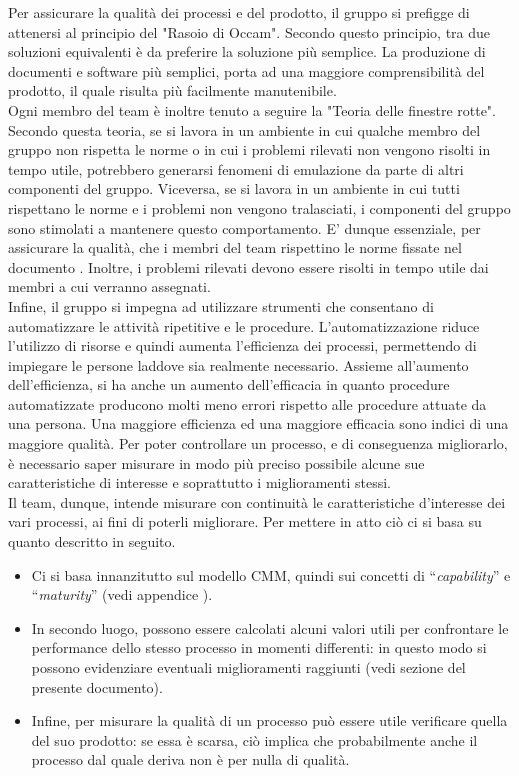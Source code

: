 
	Per assicurare la qualità dei processi e del prodotto, il gruppo \groupname{} si prefigge di attenersi al principio del "Rasoio di Occam". Secondo questo principio, tra due soluzioni equivalenti è da preferire la soluzione più semplice. La produzione di documenti e software più semplici, porta ad una maggiore comprensibilità del prodotto, il quale risulta più facilmente manutenibile.\\
Ogni membro del team è inoltre tenuto a seguire la "Teoria delle finestre rotte". Secondo questa teoria, se si lavora in un ambiente in cui qualche membro del gruppo non rispetta le norme o in cui i problemi rilevati non vengono risolti in tempo utile, potrebbero generarsi fenomeni di emulazione da parte di altri componenti del gruppo. Viceversa, se si lavora in un ambiente in cui tutti rispettano le norme e i problemi non vengono tralasciati, i componenti del gruppo sono stimolati a mantenere questo comportamento. E' dunque essenziale, per assicurare la qualità, che i membri del team rispettino le norme fissate nel documento . Inoltre, i problemi rilevati devono essere risolti in tempo utile dai membri a cui verranno assegnati.\\
Infine, il gruppo si impegna ad utilizzare strumenti che consentano di automatizzare le attività ripetitive e le procedure. L'automatizzazione riduce l'utilizzo di risorse e quindi aumenta l'efficienza dei processi, permettendo di impiegare le persone laddove sia realmente necessario. Assieme all'aumento dell'efficienza, si ha anche un aumento dell'efficacia in quanto procedure automatizzate producono molti meno errori rispetto alle procedure attuate da una persona. Una maggiore efficienza ed una maggiore efficacia sono indici di una maggiore qualità.
		Per poter controllare un processo, e di conseguenza migliorarlo, è necessario saper misurare in modo più preciso possibile alcune sue 
		caratteristiche di interesse e soprattutto i miglioramenti stessi.\\
		Il team, dunque, intende misurare con continuità le caratteristiche d'interesse dei vari processi, ai fini di poterli migliorare. Per mettere in atto ciò ci si basa su quanto descritto in seguito.
		\begin{itemize}
			\item Ci si basa innanzitutto sul modello CMM, quindi sui concetti di “\textit{capability}” e “\textit{maturity}” (vedi appendice ).
			\item In secondo luogo, possono essere calcolati alcuni valori utili per confrontare le performance dello stesso processo in momenti differenti: in questo modo si possono evidenziare eventuali miglioramenti raggiunti (vedi sezione  del presente documento).
			\item Infine, per misurare la qualità di un processo può essere utile verificare quella del suo prodotto: se essa è scarsa, ciò implica che probabilmente anche il processo dal quale deriva non è per nulla di qualità.
		\end{itemize}
